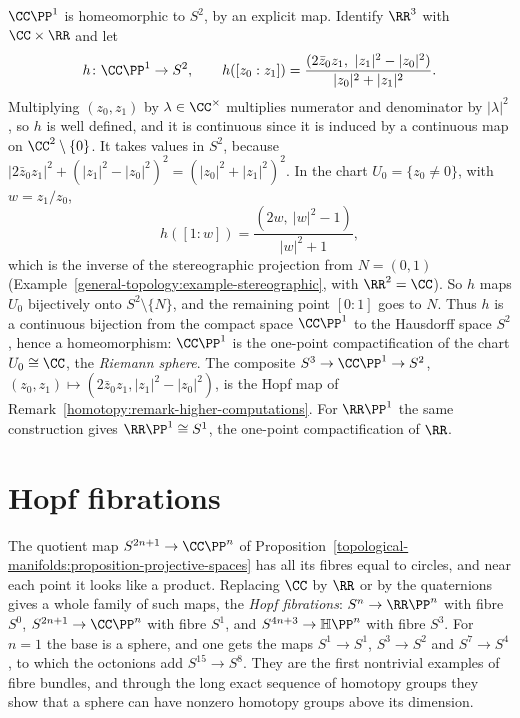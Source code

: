 \begin{example}\label{topological-manifolds:example-cp1-sphere}
$\CC\PP^1$ is homeomorphic to $S^2$, by an explicit map. Identify $\RR^3$ with $\CC \times \RR$ and let
\[
h \colon \CC\PP^1 \to S^2, \qquad h([z_0 : z_1]) = \frac{(2\bar{z}_0z_1, \ |z_1|^2 - |z_0|^2)}{|z_0|^2 + |z_1|^2}.
\]
Multiplying $(z_0, z_1)$ by $\lambda \in \CC^\times$ multiplies numerator and denominator by $|\lambda|^2$, so $h$ is well defined, and it is continuous since it is
induced by a continuous map on $\CC^2 \setminus \{0\}$. It takes values in $S^2$, because
$|2\bar{z}_0z_1|^2 + (|z_1|^2 - |z_0|^2)^2 = (|z_0|^2 + |z_1|^2)^2$. In the chart $U_0 = \{z_0 \neq 0\}$, with $w = z_1/z_0$,
\[
h([1 : w]) = \frac{(2w, \ |w|^2 - 1)}{|w|^2 + 1},
\]
which is the inverse of the stereographic projection from $N = (0, 1)$ (Example~\ref{general-topology:example-stereographic}, with $\RR^2 = \CC$). So $h$ maps
$U_0$ bijectively onto $S^2 \setminus \{N\}$, and the remaining point $[0 : 1]$ goes to $N$. Thus $h$ is a continuous bijection from the compact space $\CC\PP^1$ to
the Hausdorff space $S^2$, hence a homeomorphism: $\CC\PP^1$ is the one-point compactification of the chart $U_0 \cong \CC$, the \emph{Riemann sphere}. The
composite $S^3 \to \CC\PP^1 \to S^2$, $(z_0, z_1) \mapsto (2\bar{z}_0z_1, |z_1|^2 - |z_0|^2)$, is the Hopf map of Remark~\ref{homotopy:remark-higher-computations}.
For $\RR\PP^1$ the same construction gives $\RR\PP^1 \cong S^1$, the one-point compactification of $\RR$.
\end{example}

\section{Hopf fibrations}\label{topological-manifolds:section-hopf}

The quotient map $S^{2n+1} \to \CC\PP^n$ of Proposition~\ref{topological-manifolds:proposition-projective-spaces} has all its fibres equal to circles, and near each point it looks like a
product. Replacing $\CC$ by $\RR$ or by the quaternions gives a whole family of such maps, the \emph{Hopf fibrations}: $S^n \to \RR\PP^n$ with fibre $S^0$, $S^{2n+1} \to \CC\PP^n$ with fibre $S^1$, and
$S^{4n+3} \to \mathbb{H}\PP^n$ with fibre $S^3$. For $n = 1$ the base is a sphere, and one gets the maps $S^1 \to S^1$, $S^3 \to S^2$ and $S^7 \to S^4$, to which the octonions add $S^{15} \to S^8$. They are
the first nontrivial examples of fibre bundles, and through the long exact sequence of homotopy groups they show that a sphere can have nonzero homotopy groups above its dimension.

